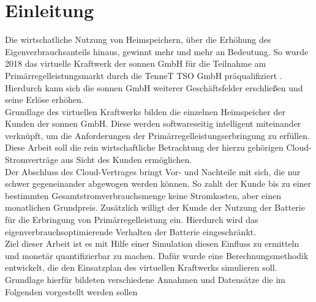 
\section{Einleitung}

Die wirtschatliche Nutzung von Heimspeichern, über die Erhöhung des Eigenverbrauchsanteils hinaus, gewinnt mehr und mehr an Bedeutung. So wurde 2018 das virtuelle Kraftwerk der sonnen GmbH für die Teilnahme am Primärregelleistungsmarkt durch die TenneT TSO GmbH präqualifiziert \parencite{tennet18}. Hierdurch kann sich die sonnen GmbH weiterer Geschäftsfelder erschließen und seine Erlöse erhöhen.\medskip\\
Grundlage des virtuellen Kraftwerks bilden die einzelnen Heimspeicher der Kunden der sonnen GmbH. Diese werden softwareseitig intelligent miteinander verknüpft, um die Anforderungen der Primärregelleistungserbringung zu erfüllen. Diese Arbeit soll die rein wirtschaftliche Betrachtung der hierzu gehörigen Cloud-Stromverträge aus Sicht des Kunden ermöglichen.\medskip\\
Der Abschluss des Cloud-Vertrages bringt Vor- und Nachteile mit sich, die nur schwer gegeneinander abgewogen werden können. So zahlt der Kunde bis zu einer bestimmten Gesamtstromverbrauchsmenge keine Stromkosten, aber einen monatlichen Grundpreis. Zusätzlich willigt der Kunde der Nutzung der Batterie für die Erbringung von Primärregelleistung ein. Hierdurch wird das eigenverbrauchsoptimierende Verhalten der Batterie eingeschränkt.\medskip\\
Ziel dieser Arbeit ist es mit Hilfe einer Simulation diesen Einfluss zu ermitteln und monetär quantifizierbar zu machen. Dafür wurde eine Berechnungsmethodik entwickelt, die den Einsatzplan des virtuellen Kraftwerks simulieren soll. Grundlage hierfür bildeten verschiedene Annahmen und Datensätze die im Folgenden vorgestellt werden sollen